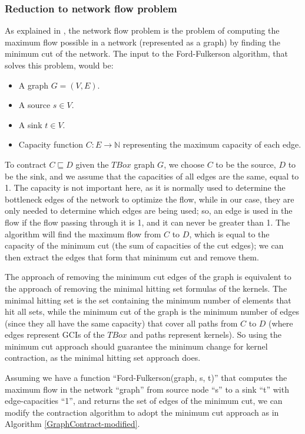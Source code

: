 \subsubsection{Reduction to network flow problem}
As explained in \cite{alg}, the network flow problem is the problem of computing the maximum flow possible in a network (represented as a graph) by finding the minimum cut of the network. The input to the Ford-Fulkerson algorithm, that solves this problem, would be:
\begin{itemize}
\item A graph $G = (V, E)$.
\item A source $s \in V$.
\item A sink $t \in V$.
\item Capacity function $C:E \rightarrow \mathbb{N}$ representing the maximum capacity of each edge.
\end{itemize}

To contract $C \sqsubseteq D$ given the $TBox$ graph $G$, we choose $C$ to be the source, $D$ to be the sink, and we assume that the capacities of all edges are the same, equal to 1. The capacity is not important here, as it is normally used to determine the bottleneck edges of the network to optimize the flow, while in our case, they are only needed to determine which edges are being used; so, an edge is used in the flow if the flow passing through it is 1, and it can never be greater than 1. The algorithm will find the maximum flow from $C$ to $D$, which is equal to the capacity of the minimum cut (the sum of capacities of the cut edges); we can then extract the edges that form that minimum cut and remove them.

The approach of removing the minimum cut edges of the graph is equivalent to the approach of removing the minimal hitting set formulas of the kernels. The minimal hitting set is the set containing the minimum number of elements that hit all sets, while the minimum cut of the graph is the minimum number of edges (since they all have the same capacity) that cover all paths from $C$ to $D$ (where edges represent GCIs of the $TBox$ and paths represent kernels). So using the minimum cut approach should guarantee the minimum change for kernel contraction, as the minimal hitting set approach does.

Assuming we have a function ``Ford-Fulkerson(graph, s, t)'' that computes the maximum flow in the network ``graph'' from source node ``s'' to a sink  ``t'' with edge-capacities ``1'', and returns the set of edges of the minimum cut, we can modify the contraction algorithm to adopt the minimum cut approach as in Algorithm \ref{GraphContract-modified}.

